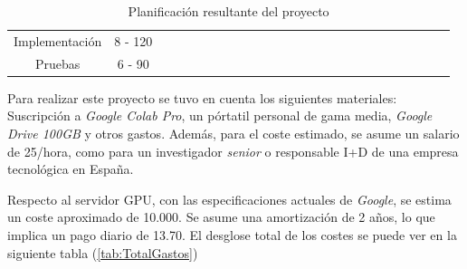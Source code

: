 \begin{table}[H]
{\begin{tabular}{|c|c|ll|llll|llll|lllll|llll|llll|}
Implementación & 8 - 120 &  &  &  &  &  &  &  &  &  \cellcolor[HTML]{9B9B9B} & \cellcolor[HTML]{9B9B9B} & \cellcolor[HTML]{9B9B9B} & \cellcolor[HTML]{9B9B9B} & &  & \cellcolor[HTML]{9B9B9B}  & \cellcolor[HTML]{9B9B9B}  & & & \cellcolor[HTML]{9B9B9B} & \cellcolor[HTML]{9B9B9B} &  &  &  \\ \cline{1-1}
Pruebas & 6 - 90 &  &  &  &  &  &  &  &  &  &  &  &  & \cellcolor[HTML]{9B9B9B}   & \cellcolor[HTML]{9B9B9B} & & & \cellcolor[HTML]{9B9B9B} & \cellcolor[HTML]{9B9B9B} &  &  & \cellcolor[HTML]{9B9B9B} & \cellcolor[HTML]{9B9B9B} & \\ \hline
\end{tabular}%
}
\caption{Planificación resultante del proyecto}
\label{tab:PlanificacionFinal}
\end{table}

Para realizar este proyecto se tuvo en cuenta los siguientes materiales:
Suscripción a \emph{Google Colab Pro}, un pórtatil personal de gama media, 
\emph{Google Drive 100GB} y otros gastos. 
Además, para el coste estimado, se asume un salario de 25\officialeuro/hora, como para un investigador \emph{senior} o
responsable I+D de una empresa tecnológica en España. 
 
Respecto al servidor GPU, con las especificaciones actuales de \emph{Google}, 
se estima un coste aproximado de 10.000\officialeuro. Se asume una amortización de 2 años, 
lo que implica un pago diario de 13.70\officialeuro. El desglose total de los costes 
se puede ver en la siguiente tabla (\ref{tab:TotalGastos})

